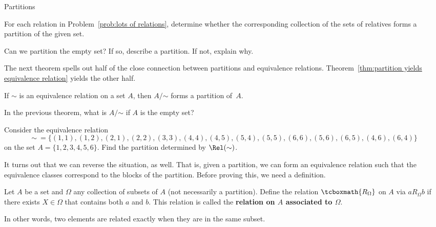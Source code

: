 \begin{section}{Partitions}
\begin{problem}
For each relation in Problem~\ref{prob:lots of relations}, determine whether the corresponding collection of the sets of relatives forms a partition of the given set.
\end{problem}

\begin{problem}
Can we partition the empty set?  If so, describe a partition.  If not, explain why.
\end{problem}

The next theorem spells out half of the close connection between partitions and equivalence relations. Theorem~\ref{thm:partition yields equivalence relation} yields the other half.

\begin{theorem}\label{thm:equiv yields partition2}
If $\sim$ is an equivalence relation on a set $A$, then $A/\mathord\sim$ forms a partition of~$A$.
\end{theorem}

\begin{problem}
In the previous theorem, what is $A/\mathord\sim$ if $A$ is the empty set?
\end{problem}

\begin{problem}
Consider the equivalence relation
\[
\sim\ =\{(1,1),(1,2),(2,1), (2,2),(3,3),(4,4),(4,5),(5,4),(5,5),(6,6),(5,6),(6,5),(4,6),(6,4)\}
\]
on the set $A=\{1,2,3,4,5,6\}$.  Find the partition determined by $\Rel(\sim)$.
\end{problem}

It turns out that we can reverse the situation, as well.  That is, given a partition, we can form an equivalence relation such that the equivalence classes correspond to the blocks of the partition.  Before proving this, we need a definition.

\begin{definition}
Let $A$ be a set and $\Omega$ any collection of subsets of $A$ (not necessarily a partition).  Define the relation $\tcboxmath{R_{\Omega}}$ on $A$ via $aR_{\Omega}b$ if there exists $X\in \Omega$ that contains both $a$ and $b$. This relation is called the \textbf{relation on $A$ associated to $\Omega$}.
\end{definition}

In other words, two elements are related exactly when they are in the same subset. %


\end{section}
